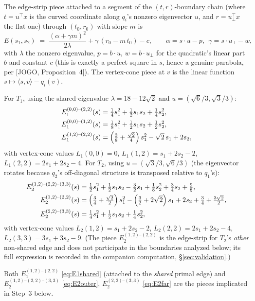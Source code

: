 \documentclass[11pt]{article}
\begin{document}
The edge-strip piece attached to a segment of the $(t,r)$-boundary chain
(where $t=u^\top x$ is the curved coordinate along $q_i$'s nonzero
eigenvector $u$, and $r=u_\perp^\top x$ the flat one) through $(t_0,r_0)$ with
slope $m$ is
\[
E(s_1,s_2) \;=\; \frac{(\alpha+\gamma m)^2}{2\lambda} + \gamma\,(r_0 - m\,t_0) - c,
\qquad \alpha = s\cdot u - p,\ \ \gamma = s\cdot u_\perp - w,
\]
with $\lambda$ the nonzero eigenvalue, $p=b\cdot u$, $w = b\cdot u_\perp$ for
the quadratic's linear part $b$ and constant $c$ (this is exactly a perfect
square in $s$, hence a genuine parabola, per [JOGO, Proposition~4]). The
vertex-cone piece at $v$ is the linear function $s\mapsto \langle s,v\rangle -
q_i(v)$.

For $T_1$, using the shared-eigenvalue $\lambda = 18-12\sqrt2$ and $u =
(\sqrt6/3,\sqrt3/3)$:
\begin{align}
E_1^{(0,0)\text{--}(2,2)}(s) &= \tfrac14 s_1^2 + \tfrac12 s_1 s_2 + \tfrac14 s_2^2, \notag\\
E_1^{(0,0)\text{--}(1,2)}(s) &= \tfrac18 s_1^2 + \tfrac12 s_1 s_2 + \tfrac12 s_2^2, \notag\\
E_1^{(1,2)\text{--}(2,2)}(s) &= \left(\tfrac38+\tfrac{\sqrt2}{4}\right) s_1^2 - \sqrt2\, s_1 + 2 s_2,
\label{eq:E1shared}
\end{align}
with vertex-cone values $L_1(0,0)=0$, $L_1(1,2)=s_1+2s_2-2$, $L_1(2,2)=2s_1+2s_2-4$.
For $T_2$, using $u=(\sqrt3/3,\sqrt6/3)$ (the eigenvector rotates because
$q_2$'s off-diagonal structure is transposed relative to $q_1$'s):
\begin{align}
E_2^{(1,2)\text{--}(2,2)\text{--}(3,3)}(s) &= \tfrac12 s_1^2 + \tfrac12 s_1 s_2 - \tfrac32 s_1 + \tfrac18 s_2^2 + \tfrac34 s_2 + \tfrac98,
\label{eq:E2outer}\\
E_2^{(1,2)\text{--}(2,2)}(s) &= \left(\tfrac34+\tfrac{\sqrt2}{2}\right)s_1^2 - \left(\tfrac32+2\sqrt2\right)s_1 + 2s_2 + \tfrac34+\tfrac{3\sqrt2}{2},
\notag\\
E_2^{(2,2)\text{--}(3,3)}(s) &= \tfrac14 s_1^2 + \tfrac12 s_1 s_2 + \tfrac14 s_2^2,
\label{eq:E2far}
\end{align}
with vertex-cone values $L_2(1,2)=s_1+2s_2-2$, $L_2(2,2)=2s_1+2s_2-4$, $L_2(3,3)=3s_1+3s_2-9$.
(The piece $E_2^{(1,2)\text{--}(2,2)}$ is the edge-strip for $T_2$'s \emph{other}
non-shared edge and does not participate in the boundaries analyzed below;
its full expression is recorded in the companion computation, \S\ref{sec:validation}.)

Both $E_1^{(1,2)\text{--}(2,2)}$ \eqref{eq:E1shared} (attached to the
\emph{shared} primal edge) and $E_2^{(1,2)\text{--}(2,2)\text{--}(3,3)}$
\eqref{eq:E2outer}, $E_2^{(2,2)\text{--}(3,3)}$ \eqref{eq:E2far} are the pieces
implicated in Step~3 below.
\end{document}
